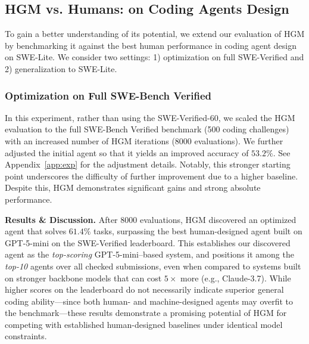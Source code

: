 \documentclass{article}
\begin{document}
\subsection{HGM vs. Humans: on Coding Agents Design}
\label{exp:vs-human}
To gain a better understanding of its potential, we extend our evaluation of HGM by benchmarking it against the best human performance in coding agent design on SWE-Lite. We consider two settings: 1) optimization on full SWE-Verified and 2) generalization to SWE-Lite.

\subsubsection{Optimization on Full SWE-Bench Verified} \label{exp:vs-human-verified}
In this experiment, rather than using the SWE-Verified-60, we scaled the HGM evaluation to the full SWE-Bench Verified benchmark (500 coding challenges) with an increased number of HGM iterations (8000 evaluations). 
We further adjusted the initial agent so that it yields an improved accuracy of $53.2\%$. See Appendix~\ref{app:exp} for the adjustment details.
Notably, this stronger starting point underscores the difficulty of further improvement due to a higher baseline. Despite this, HGM demonstrates significant gains and strong absolute performance.

\textbf{Results \& Discussion.} After 8000 evaluations, HGM discovered an optimized agent that solves $61.4\%$ tasks, surpassing the best human-designed agent built on GPT-5-mini on the SWE-Verified leaderboard. This establishes our discovered agent as the \textit{top-scoring} GPT-5-mini–based system, and positions it among the \textit{top-10} agents over all checked submissions, even when compared to systems built on stronger backbone models that can cost $5\times$ more (e.g., Claude-3.7). While higher scores on the leaderboard do not necessarily indicate superior general coding ability---since both human- and machine-designed agents may overfit to the benchmark---these results demonstrate a promising potential of HGM for competing with established human-designed baselines under identical model constraints. 
\end{document}
